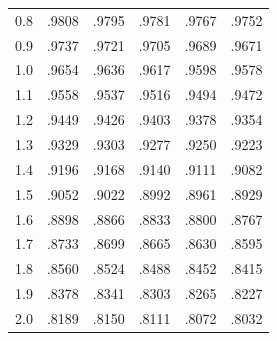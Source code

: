 \begin{minipage}[t]{95mm}
{\begin{tabular}{cccccc}
        0.8            & .9808                    & .9795                    & .9781                    & .9767                    & .9752                    \\
        0.9            & .9737                    & .9721                    & .9705                    & .9689                    & .9671                    \\[1.5ex]
        1.0            & .9654                    & .9636                    & .9617                    & .9598                    & .9578                    \\
        1.1            & .9558                    & .9537                    & .9516                    & .9494                    & .9472                    \\
        1.2            & .9449                    & .9426                    & .9403                    & .9378                    & .9354                    \\
        1.3            & .9329                    & .9303                    & .9277                    & .9250                    & .9223                    \\
        1.4            & .9196                    & .9168                    & .9140                    & .9111                    & .9082                    \\
        1.5            & .9052                    & .9022                    & .8992                    & .8961                    & .8929                    \\
        1.6            & .8898                    & .8866                    & .8833                    & .8800                    & .8767                    \\
        1.7            & .8733                    & .8699                    & .8665                    & .8630                    & .8595                    \\
        1.8            & .8560                    & .8524                    & .8488                    & .8452                    & .8415                    \\
        1.9            & .8378                    & .8341                    & .8303                    & .8265                    & .8227                    \\[1.5ex]
        2.0            & .8189                    & .8150                    & .8111                    & .8072                    & .8032                    \\

\end{tabular}}
\end{minipage}
